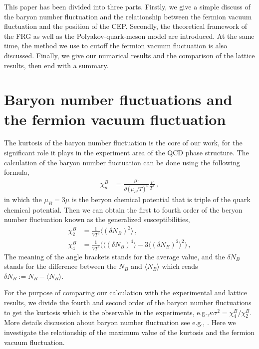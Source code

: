 \documentclass[%
reprint,
superscriptaddress,
showpacs,preprintnumbers,
 amsmath,amssymb,
 aps,
prl,
]{revtex4-1}
\begin{document}
\par
This paper has been divided into three parts. Firstly, we give a simple discuss of the baryon number fluctuation and the relationship between the fermion vacuum fluctuation and the position of the CEP. Secondly, the theoretical framework of the FRG as well as the Polyakov-quark-meson model are introduced. At the same time, the method we use to cutoff the fermion vacuum fluctuation is also discussed. Finally, we give our numarical results and the comparison of the lattice results, then end with a summary.
\section{Baryon number fluctuations and the fermion vacuum fluctuation}
\label{sec:EoS}
The kurtosis of the baryon number fluctuation is the core of our work, for the significant role it plays in the experiment area of the QCD phase structure. The calculation of the baryon number fluctuation can be done using the following formula, 
\begin{align}
   \chi_n^{B}&=\frac{\partial^n}{\partial (\mu_B/T)^n}\frac{p}{T^4}\,,\label{eq:suscept}
\end{align}
in which the $\mu_B=3\mu$ is the beryon chemical potential that is triple of the quark chemical potential. Then we can obtain the first to fourth order of the beryon number fluctuation known as the generalized susceptibilities,
\begin{align}
  \chi_2^B&=\frac{1}{VT^3}\langle(\delta N_B)^2\rangle\,,\\[2ex]
  \chi_4^B&=\frac{1}{VT^3}\Big(\langle(\delta N_B)^4\rangle-3\langle(\delta N_B)^2\rangle^2\Big)\,,
\end{align}
The meaning of the angle brackets stands for the average value, and the $\delta N_B$ stands for the difference between the $N_B$ and $\langle N_B\rangle$ which reads $\delta N_B:=N_B - \langle N_B\rangle$.\par For the purpose of comparing our calculation with the experimental and lattice results, we divide the fourth and second order of the baryon number fluctuations to get the kurtosis which is the observable in the experiments, e.g.,$\kappa\sigma^2=\chi^B_4/\chi^B_2$. More details discussion about baryon number fluctuation see e.g., \cite{Fu:2015naa}. Here we investigate the relationship of the maximum value of the kurtosis and the fermion vacuum fluctuation.
\end{document}
